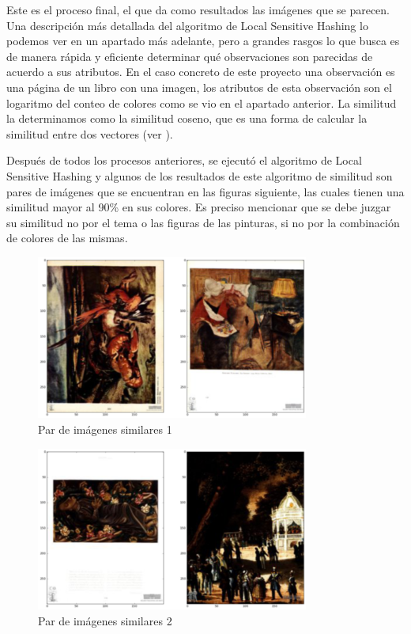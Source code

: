 Este es el proceso final, el que da como resultados las imágenes que se parecen. Una descripción más detallada del algoritmo de Local Sensitive Hashing lo podemos ver en un apartado más adelante, pero a grandes rasgos lo que busca es de manera rápida y eficiente determinar qué observaciones son parecidas de acuerdo a sus atributos. En el caso concreto de este proyecto una observación es una página de un libro con una imagen, los atributos de esta observación son el logaritmo del conteo de colores como se vio en el apartado anterior. La similitud la determinamos como la similitud coseno, que es una forma de calcular la similitud entre dos vectores (ver \cite{leskovec2014mining}).


Después de todos los procesos anteriores, se ejecutó el algoritmo de Local Sensitive Hashing y algunos de los resultados de este algoritmo de similitud son pares de imágenes que se encuentran en las figuras siguiente, las cuales tienen una similitud mayor al 90\% en sus colores. Es preciso mencionar que se debe juzgar su similitud no por el tema o las figuras de las pinturas, si no por la combinación de colores de las mismas.

\begin{figure}[H]
\centering
\includegraphics[width=0.8\textwidth]{Figures/similitud_1.png}
\caption{Par de imágenes similares 1}
\end{figure}

\begin{figure}[H]
\centering
\includegraphics[width=0.8\textwidth]{Figures/similitud_2.png}
\caption{Par de imágenes similares 2}
\end{figure}

